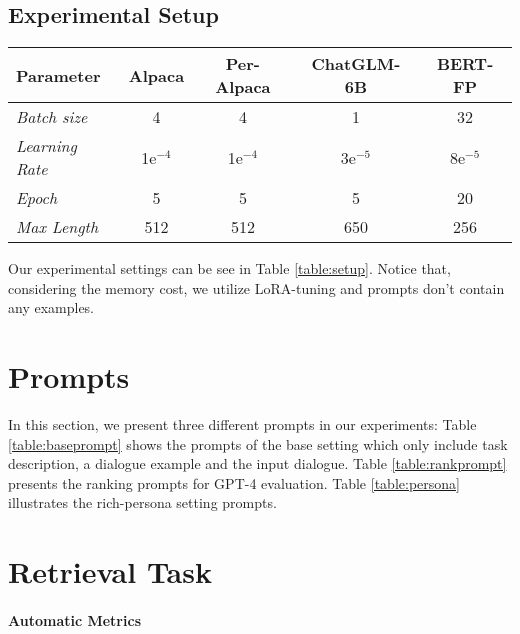 \documentclass[11pt]{article}
\begin{document}
\subsection{Experimental Setup}
\begin{table*}[t]
\footnotesize
    \centering
{
    \begin{tabular}{l c c cc}
    \toprule
\textbf{Parameter} &  Alpaca & Per-Alpaca & ChatGLM-6B  & BERT-FP \\
    \midrule
  
    \textit{Batch size}  & 4 & 4 & 1 & 32 \\

\textit{Learning Rate} &  1e$^{-4}$ & 1e$^{-4}$ &3e$^{-5}$ & 8e$^{-5}$ \\

\textit{Epoch} & 5&5 & 5 & 20 \\

\textit{Max Length} & 512 & 512 & 650 & 256 \\

    \bottomrule
    \end{tabular}
    }
    \vspace{-2mm}
    \caption{Hyper-parameters setup in fine-tuning.
    } 
    \label{table:setup}
    \vspace{-3mm}
\end{table*} Our experimental settings can be see in Table \ref{table:setup}. Notice that, considering the memory cost, we utilize LoRA-tuning \cite{hu2021lora} and prompts  don't contain any examples.



\section{Prompts}
\label{all_prompts}
In this section, we present three different prompts in our experiments: Table \ref{table:baseprompt} shows the prompts of the base setting which only include task description,  a dialogue example and the input dialogue. Table \ref{table:rankprompt} presents the ranking prompts for GPT-4 evaluation. Table \ref{table:persona} illustrates the rich-persona setting prompts.

\section{Retrieval Task}
\label{metric}

\paragraph{Automatic Metrics}
\end{document}
